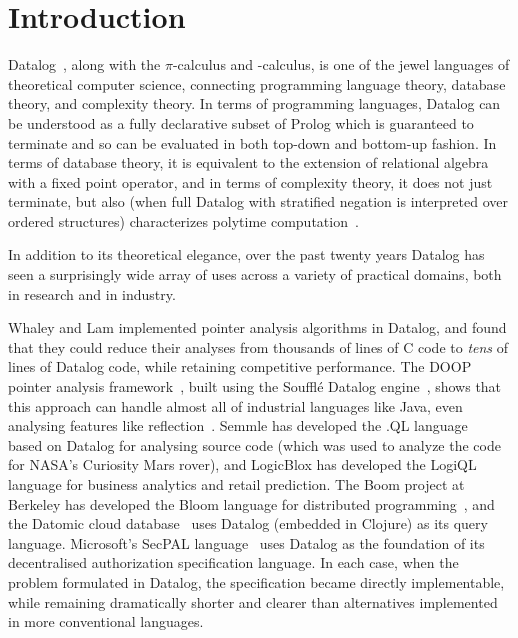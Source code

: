 \section{Introduction}
\label{sec:intro}

Datalog~\cite{datalog}, along with the $\pi$-calculus and
\fn-calculus, is one of the jewel languages of theoretical computer
science, connecting programming language theory, database theory, and
complexity theory. In terms of programming languages, Datalog can be
understood as a fully declarative subset of Prolog which is guaranteed
to terminate and so can be evaluated in both top-down and bottom-up
fashion. In terms of database theory, it is equivalent to the
extension of relational algebra with a fixed point operator, and in
terms of complexity theory, it does not just terminate, but also (when
full Datalog with stratified negation is interpreted over ordered
structures) characterizes polytime
computation~\cite{datalog-polytime}.

In addition to its theoretical elegance, over the past twenty years
Datalog has seen a surprisingly wide array of uses across a variety of
practical domains, both in research and in industry.

Whaley and Lam \cite{whaley-lam,whaley-phd} implemented pointer
analysis algorithms in Datalog, and found that they could reduce their
analyses from thousands of lines of C code to \emph{tens} of lines of
Datalog code, while retaining competitive performance. The DOOP
pointer analysis framework~\cite{doop}, built using the Souffl\'{e}
Datalog engine~\cite{souffle}, shows that this approach can handle
almost all of industrial languages like Java, even analysing features
like reflection~\cite{doop-java-reflection}. Semmle has developed the
.QL language~\cite{semmlecode,ql-inference} based on Datalog for
analysing source code (which was used to analyze the code for NASA's
Curiosity Mars rover), and LogicBlox has developed the
LogiQL~\cite{logicblox} language for business analytics and retail
prediction. The Boom project at Berkeley has developed the Bloom
language for distributed programming~\cite{bloom}, and the Datomic
cloud database~\cite{datomic} uses Datalog (embedded in Clojure) as
its query language. Microsoft's SecPAL language~\cite{secpal} uses
Datalog as the foundation of its decentralised authorization
specification language. In each case, when the problem formulated in
Datalog, the specification became directly implementable, while
remaining dramatically shorter and clearer than alternatives
implemented in more conventional languages.

